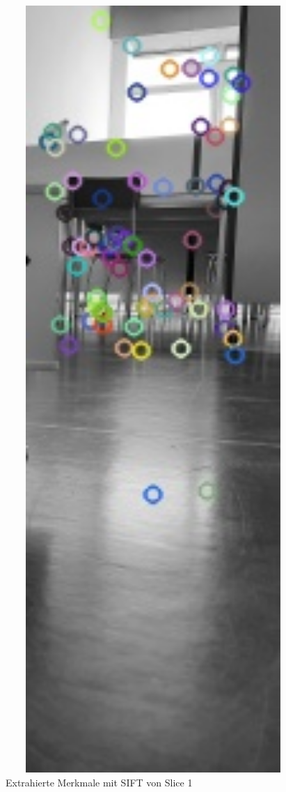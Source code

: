 \begin{figure}[H]
\begin{minipage}[t]{0.22\linewidth}
  \caption{Extrahierte Merkmale mit SIFT von Slice 1}
  \label{fig:slice1-kp2}
  \end{minipage}
  \hfill
  \begin{minipage}[t]{0.22\linewidth}
  \includegraphics[width=1.0\textwidth]{img/piktogrammerkennung/slice2_kp2.jpg}

\end{minipage}
\end{figure}

